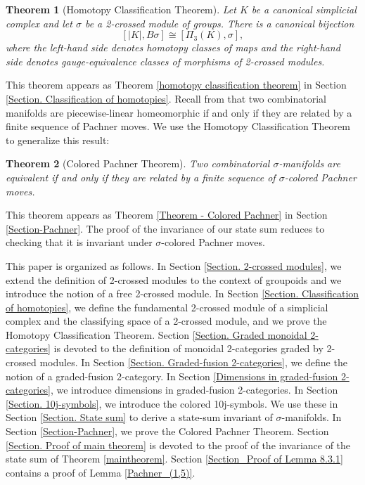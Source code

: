 \documentclass[a4paper, oneside]{amsart}
\numberwithin{equation}{subsection}
\theoremstyle{referencedlemma}
\theoremstyle{plain} %
\newtheorem*{theorem}{Theorem}
\theoremstyle{remark}
\begin{document}
\begin{theorem}[Homotopy Classification Theorem]
Let $K$ be a canonical simplicial complex and let $\sigma$ be a 2-crossed module of groups. There is a canonical bijection
$$
[\lvert K\rvert , B\sigma] \cong [\Pi_3(K), \sigma],
$$
where the left-hand side denotes homotopy classes of maps and the right-hand side denotes gauge-equivalence classes of morphisms of 2-crossed modules. 
\end{theorem}

This theorem appears as Theorem \ref{homotopy classification theorem} in Section \ref{Section. Classification of homotopies}.  Recall from \cite{lickorish_simplicial_1999} that two combinatorial manifolds are piecewise-linear homeomorphic if and only if they are related by a finite sequence of Pachner moves.  We use the Homotopy Classification Theorem to generalize this result:

\begin{theorem}[Colored Pachner Theorem]
Two combinatorial $\sigma$-manifolds are equivalent if and only if they are related by a finite sequence of $\sigma$-colored Pachner moves.
\end{theorem}

This theorem appears as Theorem \ref{Theorem - Colored Pachner} in Section \ref{Section-Pachner}.  The proof of the invariance of our state sum reduces to checking that it is invariant under $\sigma$-colored Pachner moves. 

This paper is organized as follows. In Section \ref{Section. 2-crossed modules}, we extend the definition of 2-crossed modules to the context of groupoids and we introduce the notion of a free 2-crossed module. In Section \ref{Section. Classification of homotopies}, we define the funda\-mental \mbox{2-crossed} module of a simplicial complex and the classifying space of a 2-crossed module, and we prove the Homotopy Classification Theorem.  Section \ref{Section. Graded monoidal 2-categories} is devoted to the definition of monoidal 2-categories graded by 2-crossed modules.  In Section \ref{Section. Graded-fusion 2-categories},  we define the notion of a graded-fusion 2-category. In Section \ref{Dimensions in graded-fusion 2-categories}, we introduce dimensions in graded-fusion 2-categories.  In Section \ref{Section. 10j-symbols},  we introduce the colored 10j-symbols. We use these in Section \ref{Section. State sum} to derive a state-sum invariant of $\sigma$-manifolds.  In Section \ref{Section-Pachner}, we prove the Colored Pachner Theorem.  Section \ref{Section. Proof of main theorem} is devoted to the proof of the invariance of the state sum of Theorem \ref{maintheorem}. Section \ref{Section_Proof of Lemma 8.3.1} contains a proof of Lemma \ref{Pachner_(1,5)}.
\end{document}
